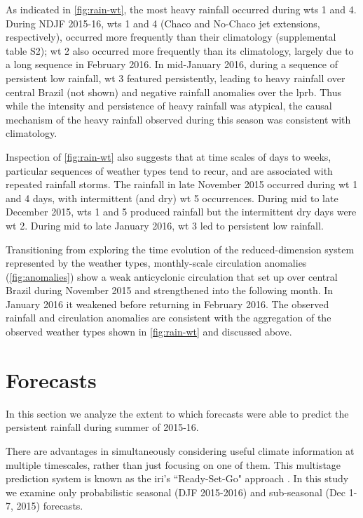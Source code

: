 \documentclass{ametsoc}
\begin{document}
As indicated in \cref{fig:rain-wt}, the most heavy rainfall occurred during \glspl{wt} 1 and 4.
During NDJF 2015-16, \glspl{wt} 1 and 4 (Chaco and No-Chaco jet extensions, respectively),  occurred more frequently than their climatology (supplemental table S2); \gls{wt} 2 also occurred more frequently than its climatology, largely due to a long sequence in February 2016.
In mid-January 2016, during a sequence of persistent low rainfall, \gls{wt} 3 featured persistently, leading to heavy rainfall over central Brazil (not shown) and negative rainfall anomalies over the \gls{lprb}.
Thus while the intensity and persistence of heavy rainfall was atypical, the causal mechanism of the heavy rainfall observed during this season was consistent with climatology.

Inspection of \cref{fig:rain-wt} also suggests that at time scales of days to weeks, particular sequences of weather types tend to recur, and are associated with repeated rainfall storms.
The rainfall in late November 2015 occurred during \gls{wt} 1 and 4 days, with intermittent (and dry) \gls{wt} 5 occurrences.
During mid to late December 2015, \glspl{wt} 1 and 5 produced rainfall but the intermittent dry days were \gls{wt} 2.
During mid to late January 2016, \gls{wt} 3 led to persistent low rainfall.

Transitioning from exploring the time evolution of the reduced-dimension system represented by the weather types, monthly-scale circulation anomalies (\cref{fig:anomalies}) show a weak anticyclonic circulation that set up over central Brazil during November 2015 and strengthened into the following month.
In January 2016 it weakened before returning in February 2016.
The observed rainfall and circulation anomalies are consistent with the aggregation of the observed weather types shown in \cref{fig:rain-wt} and discussed above.


\section{Forecasts} \label{sec:fcsts}

In this section we analyze the extent to which forecasts were able to predict the persistent rainfall during summer of 2015-16.

There are advantages in simultaneously considering useful climate information at multiple timescales, rather than just focusing on one of them.
This multistage prediction system is known as the \gls{iri}'s ``Ready-Set-Go" approach \citep{Hellmuth2011,Goddard2014}.
In this study we examine only probabilistic seasonal (DJF 2015-2016) and sub-seasonal (Dec 1-7, 2015) forecasts.
\end{document}

